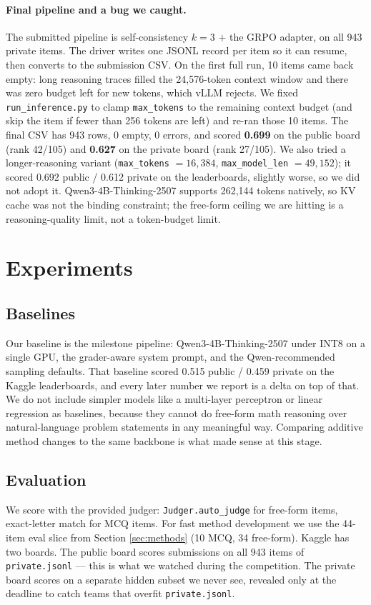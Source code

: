 \documentclass{article}
\begin{document}
\paragraph{Final pipeline and a bug we caught.}
The submitted pipeline is self-consistency $k=3$ $+$ the
GRPO adapter, on all 943 private items. The driver writes one
JSONL record per item so it can resume, then converts to the
submission CSV. On the first full run, 10 items came back empty:
long reasoning traces filled the 24{,}576-token context window
and there was zero budget left for new tokens, which vLLM rejects.
We fixed \texttt{run\_inference.py} to clamp \texttt{max\_tokens}
to the remaining context budget (and skip the item if fewer than
256 tokens are left) and re-ran those 10 items. The final CSV has
943 rows, 0 empty, 0 errors, and scored \textbf{0.699} on the
public board (rank 42/105) and \textbf{0.627} on the private board
(rank 27/105). We also tried a
longer-reasoning variant (\texttt{max\_tokens} $=16{,}384$,
\texttt{max\_model\_len} $=49{,}152$); it scored 0.692 public /
0.612 private on the leaderboards, slightly worse, so we did not
adopt it. Qwen3-4B-Thinking-2507 supports
262{,}144 tokens natively, so KV cache was not the binding
constraint; the free-form ceiling we are hitting is a
reasoning-quality limit, not a token-budget limit.


\section{Experiments}
\label{sec:experiments}

\subsection{Baselines}
\label{sec:baselines}
Our baseline is the milestone pipeline: Qwen3-4B-Thinking-2507
under INT8 on a single GPU, the grader-aware system prompt, and
the Qwen-recommended sampling defaults. That baseline scored
0.515 public / 0.459 private on the Kaggle leaderboards, and
every later number we report is a delta on top of that. We do not include simpler
models like a multi-layer perceptron or linear regression as
baselines, because they cannot do free-form math reasoning over
natural-language problem statements in any meaningful way.
Comparing additive method changes to the same backbone is what
made sense at this stage.

\subsection{Evaluation}
\label{sec:evaluation}
We score with the provided judger: \texttt{Judger.auto\_judge}
for free-form items, exact-letter match for MCQ items. For fast
method development we use the 44-item eval slice from Section
\ref{sec:methods} (10 MCQ, 34 free-form). Kaggle has two boards. The public board scores submissions on all
943 items of \texttt{private.jsonl} --- this is what we watched
during the competition. The private board scores on a separate
hidden subset we never see, revealed only at the deadline to catch
teams that overfit \texttt{private.jsonl}.
\end{document}
